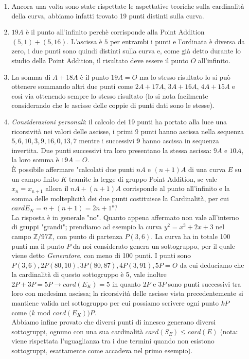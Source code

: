 \documentclass[a4paper,12pt]{tesiinfo}
\begin{document}
\begin{enumerate}
    
    \item Ancora una volta sono state rispettate le aspettative teoriche sulla cardinalit\`a della curva, abbiamo infatti trovato 19 punti distinti sulla curva.
    
    \item $19A$ \`e il punto all'infinito perch\`e corrisponde alla Point Addition $(5, 1) + (5, 16)$. L'ascissa \`e $5$ per entrambi i punti e l'ordinata \`e diversa da zero, i due punti sono quindi distinti sulla curva e, come gi\`a detto durante lo studio della Point Addition, il risultato deve essere il punto $O$ all'infinito.
    
    \item La somma di $A + 18A$ \`e il punto $19A = O$ ma lo stesso risultato lo si pu\`o ottenere sommando altri due punti come $2A + 17A$, $3A + 16A$, $4A + 15A$ e cos\`i via ottenendo sempre lo stesso risultato (lo si nota facilmente considerando che le ascisse delle coppie di punti dati sono le stesse).
    
    \item \textit{Considerazioni personali}: il calcolo dei 19 punti ha portato alla luce una ricorsivit\`a nei valori delle ascisse, i primi 9 punti hanno ascissa nella sequenza $5, 6, 10, 3, 9, 16, 0, 13, 7$ mentre i successivi 9 hanno ascissa in sequenza invertita. Due punti successivi tra loro presentano la stessa ascissa: $9A$ e $10A$, la loro somma \`e $19A = O$. 
    \\
    \`E possibile affermare "calcolati due punti $nA$ e $(n+1)A$ di una curva $E$ su un campo finito $K$ tramite la legge di gruppo Point Addition, se vale $x_n = x_{n+1}$ allora il $nA + (n+1)A$ corrisponde al punto all'infinito e la somma delle molteplicit\`a dei due punti costituisce la Cardinalit\`a, per cui $cardE_K = n+(n+1) = 2n+1$"?
    \\
    La risposta \`e in generale "no". Quanto appena affermato non vale all'interno di gruppi "grandi"; prendiamo ad esempio la curva $y^2 = x^3 + 2x+3$ nel campo $\mathbb{Z}/97\mathbb{Z}$, con punto di partenza $P(3, 6)$. La curva ha in totale 100 punti ma il punto $P$ da noi considerato genera un sottogruppo, per il quale viene detto \textit{Generatore}, con meno di 100 punti. I punti sono $P(3, 6), 2P(80, 10), 3P(80, 87), 4P(3, 91), 5P = O$ da cui deduciamo che la cardinalit\`a di questo sottogruppo \`e 5, vale inoltre $2P+3P = 5P \to card(E_K) = 5$ in quanto $2P$ e $3P$ sono punti successivi tra loro con medesima ascissa; la ricorsivit\`a delle ascisse vista precedentemente si mantiene valida nel sottogruppo per cui possiamo scrivere ogni punto $kP$ come $(k$ mod $card(E_K))P$.\\
    Abbiamo infine provato che diversi punti di innesco generano diversi sottogruppi, ognuno con una sua cardinalit\`a $card(S_E) \le card(E)$ (nota: viene rispettata l'uguaglianza tra i due termini quando non esistono sottogruppi, esattamente come accadeva nel primo esempio). 
    
\end{enumerate}
\end{document}
